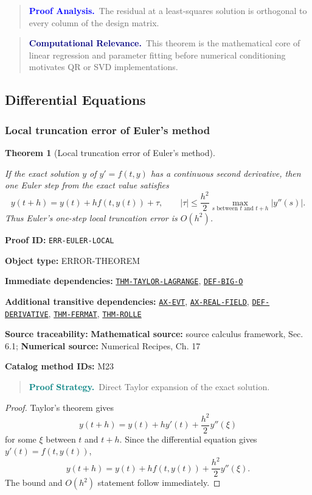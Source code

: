 \documentclass[10pt]{article}
\newcommand{\pidraw}[1]{\begingroup\urlstyle{tt}\nolinkurl{#1}\endgroup}
\newcommand{\pidref}[1]{\hyperref[prf:#1]{\pidraw{#1}}}
\newtheorem{theorem}{Theorem}[section]
\theoremstyle{definition}
\theoremstyle{remark}
\newenvironment{proofstrategy}
{\begin{quote}\small\noindent\textbf{\textcolor{teal}{Proof Strategy.}}\ }
{\end{quote}}
\newenvironment{proofanalysis}
{\begin{quote}\small\noindent\textbf{\textcolor{blue}{Proof Analysis.}}\ }
{\end{quote}}
\newenvironment{computationalrelevance}
{\begin{quote}\small\noindent\textbf{\textcolor{navy}{Computational Relevance.}}\ }
{\end{quote}}
\newcommand{\meta}[2]{\noindent\textbf{#1:} #2\par}
\begin{document}
\begin{proofanalysis}The residual at a least-squares solution is orthogonal to every column of the design matrix.\end{proofanalysis}

\begin{computationalrelevance}This theorem is the mathematical core of linear regression and parameter fitting before numerical conditioning motivates QR or SVD implementations.\end{computationalrelevance}

\subsection{Differential Equations}

\subsubsection{Local truncation error of Euler's method}

\begin{theorem}[Local truncation error of Euler's method]\label{prf:ERR-EULER-LOCAL}

If the exact solution $y$ of $y'=f(t,y)$ has a continuous second derivative, then one Euler step from the exact value satisfies
\[
y(t+h)=y(t)+h f(t,y(t))+\tau,\qquad
|\tau|\le \frac{h^2}{2}\max_{s\text{ between }t\text{ and }t+h}|y''(s)|.
\]
Thus Euler's one-step local truncation error is $O(h^2)$.

\end{theorem}

\meta{Proof ID}{\pidraw{ERR-EULER-LOCAL}}
\meta{Object type}{ERROR-THEOREM}
\meta{Immediate dependencies}{\pidref{THM-TAYLOR-LAGRANGE}, \pidref{DEF-BIG-O}}
\meta{Additional transitive dependencies}{\pidref{AX-EVT}, \pidref{AX-REAL-FIELD}, \pidref{DEF-DERIVATIVE}, \pidref{THM-FERMAT}, \pidref{THM-ROLLE}}
\meta{Source traceability}{\textbf{Mathematical source:} source calculus framework, Sec. 6.1; \textbf{Numerical source:} Numerical Recipes, Ch. 17}
\meta{Catalog method IDs}{M23}

\begin{proofstrategy}Direct Taylor expansion of the exact solution.\end{proofstrategy}

\begin{proof}

Taylor's theorem gives
\[
y(t+h)=y(t)+hy'(t)+\frac{h^2}{2}y''(\xi)
\]
for some $\xi$ between $t$ and $t+h$. Since the differential equation gives
$y'(t)=f(t,y(t))$,
\[
y(t+h)=y(t)+h f(t,y(t))+\frac{h^2}{2}y''(\xi).
\]
The bound and $O(h^2)$ statement follow immediately.

\end{proof}
\end{document}
